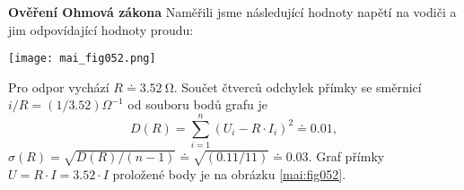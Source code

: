 \begin{mdframed}[style=mdexam]
  \begin{example}\label{mai:exam076}
    \textbf{Ověření Ohmová zákona}\newline
    Naměřili jsme následující hodnoty napětí na vodiči a jim odpovídající hodnoty proudu:
    
    \begin{center}
    \end{center}

    {\centering
    \captionsetup{type=figure}
    \texttt{[image: mai\_fig052.png]}
    \par}
    Pro odpor vychází \(R\doteq\SI{3.52}{\ohm}\). Součet čtverců odchylek přímky se směrnicí \(i/R
    = (1/\num{3.52})\Omega^{-1}\) od souboru bodů grafu je
    \begin{equation*}
      D(R) = \sum_{i=1}^{n}(U_i - R\cdot I_i)^2 \doteq\num{0.01},
    \end{equation*}
    \(\sigma(R) = \sqrt{D(R)/(n-1)}\doteq\sqrt{(\num{0.11}/11)}\doteq\num{0.03}\).  Graf přímky \(U
    = R\cdot I = \num{3.52}\cdot I\) proložené body je na obrázku \ref{mai:fig052}.
  \end{example}
\end{mdframed}